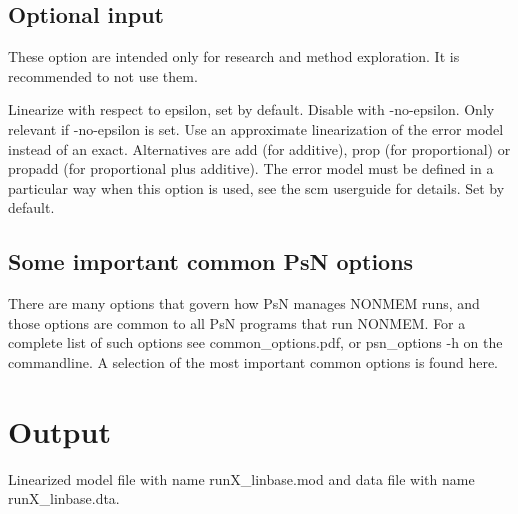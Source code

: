 \subsection{Optional input}
These option are intended only for research and method exploration.
It is recommended to not use them.
\begin{optionlist}
Linearize with respect to epsilon, set by default. Disable with -no-epsilon.
\nextopt
{}
Only relevant if -no-epsilon is set. 
Use an approximate linearization of the error model instead of an exact.
Alternatives are add (for additive), prop (for proportional) or
propadd (for proportional plus additive).
The error model must be defined in a particular way when this option is used,
see the scm userguide for details.
\nextopt
{}
Set by default. 
\nextopt
\end{optionlist}

\subsection{Some important common PsN options}
There are many options that govern how PsN manages NONMEM runs, and
those options are common to all PsN programs that run NONMEM.
For a complete list of such options see common\_options.pdf, 
or psn\_options -h on the commandline. A selection of
the most important common options is found here.



\section{Output}
Linearized model file with name runX\_linbase.mod and data file with name runX\_linbase.dta.



